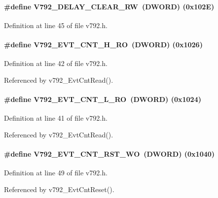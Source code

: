 \paragraph[{V792\_\-DELAY\_\-CLEAR\_\-RW}]{\setlength{\rightskip}{0pt plus 5cm}\#define V792\_\-DELAY\_\-CLEAR\_\-RW~({\bf DWORD}) (0x102E)}\hfill\label{v792_8h_a4d7e0cbf3e49fdb789d6095d21815c07}


Definition at line 45 of file v792.h.
\paragraph[{V792\_\-EVT\_\-CNT\_\-H\_\-RO}]{\setlength{\rightskip}{0pt plus 5cm}\#define V792\_\-EVT\_\-CNT\_\-H\_\-RO~({\bf DWORD}) (0x1026)}\hfill\label{v792_8h_a6a46aa63d149671acd309d58d2d31d52}


Definition at line 42 of file v792.h.

Referenced by v792\_\-EvtCntRead().
\paragraph[{V792\_\-EVT\_\-CNT\_\-L\_\-RO}]{\setlength{\rightskip}{0pt plus 5cm}\#define V792\_\-EVT\_\-CNT\_\-L\_\-RO~({\bf DWORD}) (0x1024)}\hfill\label{v792_8h_a363d52cf7d34a78311f78e5e3a181d21}


Definition at line 41 of file v792.h.

Referenced by v792\_\-EvtCntRead().
\paragraph[{V792\_\-EVT\_\-CNT\_\-RST\_\-WO}]{\setlength{\rightskip}{0pt plus 5cm}\#define V792\_\-EVT\_\-CNT\_\-RST\_\-WO~({\bf DWORD}) (0x1040)}\hfill\label{v792_8h_ae0877a85cced5a7ccc9e8837148f625b}


Definition at line 49 of file v792.h.

Referenced by v792\_\-EvtCntReset().

